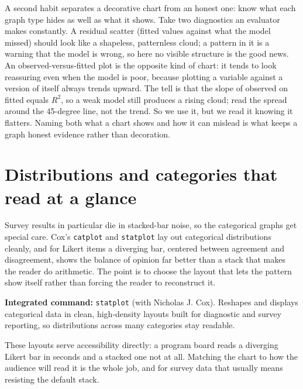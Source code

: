 \documentclass[
    a4paper,
    fontsize=10pt,
    twoside=true,
    numbers=noenddot,
]{kaobook}
\begin{document}
A second habit separates a decorative chart from an honest one: know what each graph type hides as well as what it shows. Take two diagnostics an evaluator makes constantly. A residual scatter (fitted values against what the model missed) should look like a shapeless, patternless cloud; a pattern in it is a warning that the model is wrong, so here no visible structure is the good news. An observed-versus-fitted plot is the opposite kind of chart: it tends to look reassuring even when the model is poor, because plotting a variable against a version of itself always trends upward. The tell is that the slope of observed on fitted equals $R^2$, so a weak model still produces a rising cloud; read the spread around the 45-degree line, not the trend. So we use it, but we read it knowing it flatters. Naming both what a chart shows and how it can mislead is what keeps a graph honest evidence rather than decoration.

\section{Distributions and categories that read at a glance}
Survey results in particular die in stacked-bar noise, so the categorical graphs get special care. Cox's \texttt{catplot} and \texttt{statplot} lay out categorical distributions cleanly, and for Likert items a diverging bar, centered between agreement and disagreement, shows the balance of opinion far better than a stack that makes the reader do arithmetic. The point is to choose the layout that lets the pattern show itself rather than forcing the reader to reconstruct it.

\begin{kaobox}[frametitle=Package Integration: \texttt{statplot}]
\textbf{Integrated command:} \texttt{statplot} (with Nicholas J. Cox). Reshapes and displays categorical data in clean, high-density layouts built for diagnostic and survey reporting, so distributions across many categories stay readable.
\end{kaobox}

These layouts serve accessibility directly: a program board reads a diverging Likert bar in seconds and a stacked one not at all. Matching the chart to how the audience will read it is the whole job, and for survey data that usually means resisting the default stack.
\end{document}
